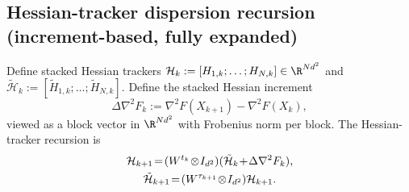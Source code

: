 \documentclass[review,onefignum,onetabnum]{siamart171218}
\begin{document}
	\subsection{Hessian-tracker dispersion recursion (increment-based, fully expanded)}
	
	Define stacked Hessian trackers $\mathcal H_k:=[H_{1,k};\dots;H_{N,k}]\in\R^{Nd^2}$ and
	$\tilde{\mathcal H}_k:=[\tilde H_{1,k};\dots;\tilde H_{N,k}]$.
	Define the stacked Hessian increment
	\[
	\Delta\nabla^2 F_k:=\nabla^2 F(X_{k+1})-\nabla^2 F(X_k),
	\]
	viewed as a block vector in $\R^{Nd^2}$ with Frobenius norm per block.
	The Hessian-tracker recursion is
	\begin{gather}
		\mathcal H_{k+1}\!=\!(W^{t_k}\!\otimes\! I_{d^2})(\tilde{\mathcal H}_k\!+\!\Delta\nabla^2 F_k),\label{eq:H_update_stack}\\
		\tilde{\mathcal H}_{k+1}\!=\!(W^{\tau_{k+1}}\!\otimes\! I_{d^2})\mathcal H_{k+1}.\notag
	\end{gather}
	
\end{document}

